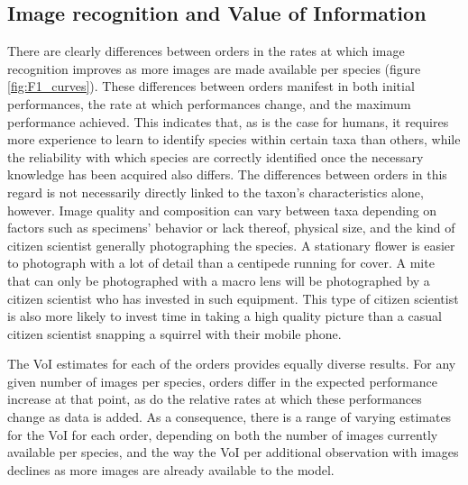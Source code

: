 \documentclass{article}
\begin{document}
\subsection*{Image recognition and Value of Information}
There are clearly differences between orders in the rates at which image recognition improves as more images are made available per species (figure \ref{fig:F1_curves}). These differences between orders manifest in both initial performances, the rate at which performances change, and the maximum performance achieved. This indicates that, as is the case for humans, it requires more experience to learn to identify species within certain taxa than others, while the reliability with which species are correctly identified once the necessary knowledge has been acquired also differs. The differences between orders in this regard is not necessarily directly linked to the taxon's characteristics alone, however. Image quality and composition can vary between taxa depending on factors such as specimens' behavior or lack thereof, physical size, and the kind of citizen scientist generally photographing the species. A stationary flower is easier to photograph with a lot of detail than a centipede running for cover. A mite that can only be photographed with a macro lens will be photographed by a citizen scientist who has invested in such equipment. This type of citizen scientist is also more likely to invest time in taking a high quality picture than a casual citizen scientist snapping a squirrel with their mobile phone.

The VoI estimates for each of the orders provides equally diverse results. For any given number of images per species, orders differ in the expected performance increase at that point, as do the relative rates at which these performances change as data is added. As a consequence, there is a range of varying estimates for the VoI for each order, depending on both the number of images currently available per species, and the way the VoI per additional observation with images declines as more images are already available to the model.
\end{document}
